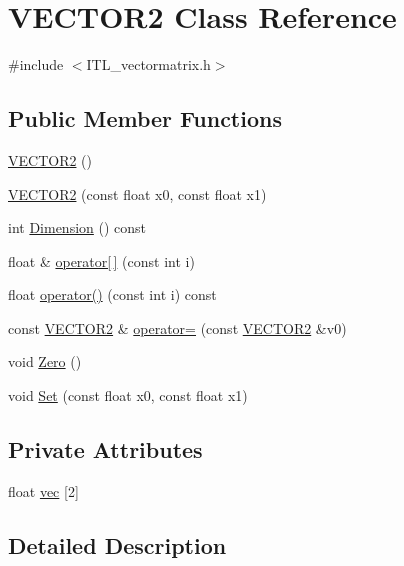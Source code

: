 \hypertarget{classVECTOR2}{
\section{VECTOR2 Class Reference}
\label{classVECTOR2}
}


{\ttfamily \#include $<$ITL\_\-vectormatrix.h$>$}

\subsection*{Public Member Functions}
\begin{DoxyCompactItemize}
\item 
\hyperlink{classVECTOR2_a321837bdc28f77b6958cb2bccb41fc92}{VECTOR2} ()
\item 
\hyperlink{classVECTOR2_a7ad80af0b479f2c9fc1cbe8c3c912e13}{VECTOR2} (const float x0, const float x1)
\item 
int \hyperlink{classVECTOR2_a6c5930e1fbcbbb6b9fea0db80b83a515}{Dimension} () const 
\item 
float \& \hyperlink{classVECTOR2_af6d23b6a2fd595314c7b0fbf83ad723a}{operator\mbox{[}$\,$\mbox{]}} (const int i)
\item 
float \hyperlink{classVECTOR2_ab99d8f6de7559cc0ce413820449dff33}{operator()} (const int i) const 
\item 
const \hyperlink{classVECTOR2}{VECTOR2} \& \hyperlink{classVECTOR2_a89f1c28aa5e14ab1f32d12d9d68b4648}{operator=} (const \hyperlink{classVECTOR2}{VECTOR2} \&v0)
\item 
void \hyperlink{classVECTOR2_aa1c6e9606376454625184342925a6fce}{Zero} ()
\item 
void \hyperlink{classVECTOR2_acb0b60a765f7c11fbc43d6559f8eae19}{Set} (const float x0, const float x1)
\end{DoxyCompactItemize}
\subsection*{Private Attributes}
\begin{DoxyCompactItemize}
\item 
float \hyperlink{classVECTOR2_a2a652a951bed082365807c39e702d79a}{vec} \mbox{[}2\mbox{]}
\end{DoxyCompactItemize}


\subsection{Detailed Description}


